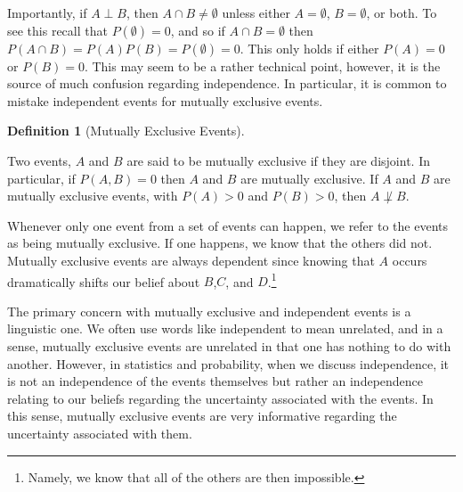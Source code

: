 \documentclass[
  letterpaper,
  DIV=11,
  numbers=noendperiod]{scrreprt}
\theoremstyle{definition}
\theoremstyle{definition}
\theoremstyle{definition}
\newtheorem{definition}{Definition}[chapter]
\theoremstyle{remark}
\begin{document}
Importantly, if \(A\perp B\), then \(A\cap B\neq \emptyset\) unless
either \(A=\emptyset\), \(B=\emptyset\), or both. To see this recall
that \(P(\emptyset) = 0\), and so if \(A\cap B = \emptyset\) then
\(P(A\cap B) = P(A)P(B) = P(\emptyset) = 0\). This only holds if either
\(P(A) = 0\) or \(P(B) = 0\). This may seem to be a rather technical
point, however, it is the source of much confusion regarding
independence. In particular, it is common to mistake independent events
for mutually exclusive events.

\begin{definition}[Mutually Exclusive
Events]\protect\hypertarget{def-mutually-exclusive-events}{}\label{def-mutually-exclusive-events}

Two events, \(A\) and \(B\) are said to be mutually exclusive if they
are disjoint. In particular, if \(P(A,B) = 0\) then \(A\) and \(B\) are
mutually exclusive. If \(A\) and \(B\) are mutually exclusive events,
with \(P(A) > 0\) and \(P(B) > 0\), then \(A\not\perp B\).

\end{definition}

Whenever only one event from a set of events can happen, we refer to the
events as being mutually exclusive. If one happens, we know that the
others did not. Mutually exclusive events are always dependent since
knowing that \(A\) occurs dramatically shifts our belief about
\(B\),\(C\), and \(D\).\footnote{Namely, we know that all of the others
  are then impossible.}

The primary concern with mutually exclusive and independent events is a
linguistic one. We often use words like independent to mean unrelated,
and in a sense, mutually exclusive events are unrelated in that one has
nothing to do with another. However, in statistics and probability, when
we discuss independence, it is not an independence of the events
themselves but rather an independence relating to our beliefs regarding
the uncertainty associated with the events. In this sense, mutually
exclusive events are very informative regarding the uncertainty
associated with them.
\end{document}
